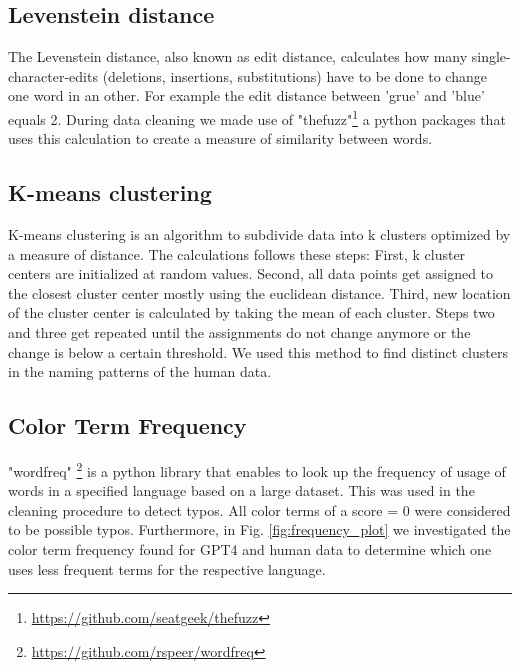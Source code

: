 \subsection{Levenstein distance}
The Levenstein distance, also known as edit distance, calculates how many single-character-edits (deletions, insertions, substitutions) have to be done to change one word in an other. For example the edit distance between 'grue' and 'blue' equals 2.
During data cleaning we made use of "thefuzz"\footnote{\url{https://github.com/seatgeek/thefuzz}} a python packages that uses this calculation to create a measure of similarity between words.

\subsection{K-means clustering}
K-means clustering is an algorithm to subdivide data into k clusters optimized by a measure of distance. The calculations follows these steps: First, k cluster centers are initialized at random values. Second, all data points get assigned to the closest cluster center mostly using the euclidean distance. Third, new location of the cluster center is calculated by taking the mean of each cluster. Steps two and three get repeated until the assignments do not change anymore or the change is below a certain threshold. We used this method to find distinct clusters in the naming patterns of the human data.


\subsection{Color Term Frequency}
"wordfreq" \footnote{\url{https://github.com/rspeer/wordfreq}} is a python library that enables to look up the frequency of usage of words in a specified language based on a large dataset. This was used in the cleaning procedure to detect typos. All color terms of a score = 0 were considered to be possible typos.
Furthermore, in Fig. \ref{fig:frequency_plot} we investigated the color term frequency found for GPT4 and human data to determine which one uses less frequent terms for the respective language.